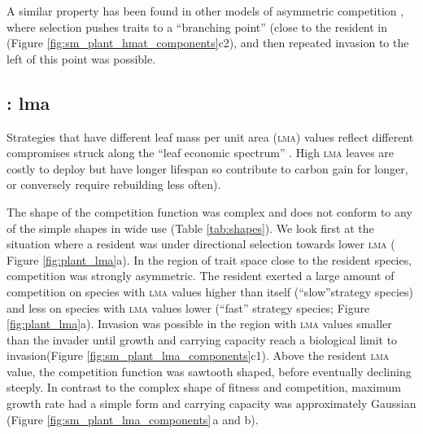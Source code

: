 \documentclass[a4paper,11pt]{article}
\begin{document}
A similar property has been found in other models of asymmetric competition \citep[e.g.,][]{Kisdi-1999}, where selection pushes traits to a ``branching point'' (close to the resident in (Figure \ref{fig:sm_plant_hmat_components}c2), and then repeated invasion to the left of this point was possible.


\subsection{\plant: lma}
Strategies that have different leaf mass per unit area (\textsc{lma}) values reflect different compromises struck along the ``leaf economic spectrum''
\citep{Reich-1997,Wright-2004}.
High \textsc{lma} leaves are costly to deploy but have longer lifespan so contribute to carbon gain for longer, or conversely require rebuilding less often).

The shape of the competition function was complex and does not conform to any of the simple shapes in wide use (Table \ref{tab:shapes}).
We look first at the situation where a resident was under directional selection towards lower \textsc{lma} ( Figure \ref{fig:plant_lma}a).
%
In the region of trait space close to the resident species, competition was strongly asymmetric. The resident exerted a large amount of competition on species with \textsc{lma} values higher than itself (``slow''strategy species) and less on species with \textsc{lma} values lower
(``fast'' strategy species; Figure \ref{fig:plant_lma}a).
Invasion was possible in the region with \textsc{lma} values smaller than the invader until growth and carrying capacity reach a biological limit to invasion(Figure \ref{fig:sm_plant_lma_components}c1).
%
Above the resident \textsc{lma} value, the competition function was sawtooth shaped, before eventually declining steeply.
%
In contrast to the complex shape of fitness and competition, maximum growth rate had a simple form and carrying capacity was approximately Gaussian (Figure \ref{fig:sm_plant_lma_components}\,a and b).
\end{document}
